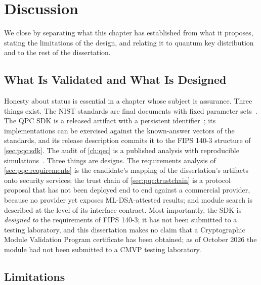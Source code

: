 \section{Discussion}\label{sec:pqc:discussion}

We close by separating what this chapter has established from what it proposes, stating the limitations of the design, and relating it to quantum key distribution and to the rest of the dissertation.

\subsection{What Is Validated and What Is Designed}\label{sec:pqc:validated}

Honesty about status is essential in a chapter whose subject is assurance. Three things exist. The NIST standards are final documents with fixed parameter sets~\cite{nist2024fips203,nist2024fips204,nist2024fips205}. The QPC SDK is a released artifact with a persistent identifier~\cite{guo2026lightriderqpc}; its implementations can be exercised against the known-answer vectors of the standards, and its release description commits it to the FIPS 140-3 structure of \cref{sec:pqc:sdk}. The audit of \cref{ch:qec} is a published analysis with reproducible simulations~\cite{guo2026qecaudit}. Three things are designs. The requirements analysis of \cref{sec:pqc:requirements} is the candidate's mapping of the dissertation's artifacts onto security services; the trust chain of \cref{sec:pqc:trustchain} is a protocol proposal that has not been deployed end to end against a commercial provider, because no provider yet exposes ML-DSA-attested results; and module search is described at the level of its interface contract. Most importantly, the SDK is \emph{designed to} the requirements of FIPS 140-3; it has not been submitted to a testing laboratory, and this dissertation makes no claim that a Cryptographic Module Validation Program certificate has been obtained; as of October 2026 the module had not been submitted to a CMVP testing laboratory.

\subsection{Limitations}\label{sec:pqc:limitations}

